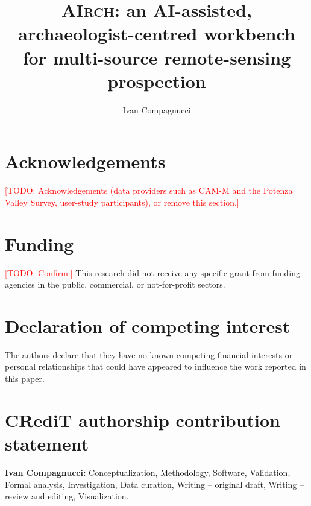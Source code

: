 \documentclass[review,authoryear,12pt]{elsarticle}
\newcommand{\airch}{\textsc{AIrch}}
\newcommand{\todo}[1]{\textcolor{red}{[TODO: #1]}}
\begin{document}
\begin{frontmatter}

\title{\airch: an AI-assisted, archaeologist-centred workbench for multi-source remote-sensing prospection}

\author[aff1]{Ivan Compagnucci}

\end{frontmatter}

\section*{Acknowledgements}
\todo{Acknowledgements (data providers such as CAM-M and the Potenza Valley Survey, user-study participants), or remove this section.}

\section*{Funding}
\todo{Confirm:} This research did not receive any specific grant from funding agencies in the public, commercial, or not-for-profit sectors.

\section*{Declaration of competing interest}
The authors declare that they have no known competing financial interests or personal relationships that could have appeared to influence the work reported in this paper.

\section*{CRediT authorship contribution statement}
\textbf{Ivan Compagnucci:} Conceptualization, Methodology, Software, Validation, Formal analysis, Investigation, Data curation, Writing -- original draft, Writing -- review and editing, Visualization.
\end{document}
